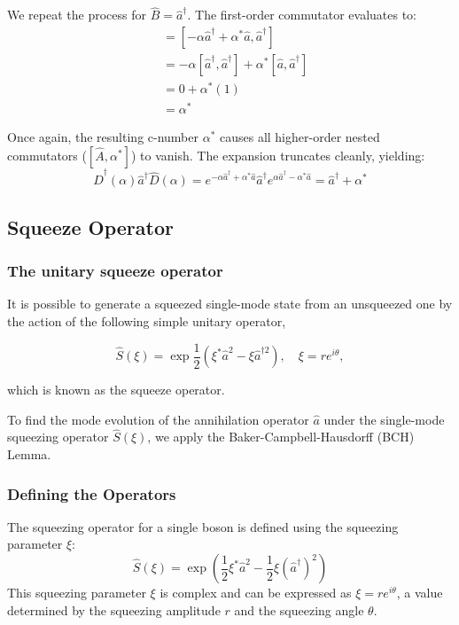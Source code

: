We repeat the process for $\hat{B} = \hat{a}^{\dagger}$. The first-order commutator evaluates to:
\begin{align*}
[\hat{A},\hat{a}^{\dagger}] &= [-\alpha\hat{a}^{\dagger}+\alpha^{*}\hat{a}, \hat{a}^{\dagger}] \\
&= -\alpha[\hat{a}^{\dagger},\hat{a}^{\dagger}] + \alpha^{*}[\hat{a},\hat{a}^{\dagger}] \\
&= 0 + \alpha^{*}(1) \\
&= \alpha^{*}
\end{align*}

Once again, the resulting c-number $\alpha^{*}$ causes all higher-order nested commutators ($[\hat{A},\alpha^{*}]$) to vanish. The expansion truncates cleanly, yielding:
\begin{equation*} \hat{D}^{\dagger}(\alpha)\hat{a}^{\dagger}\hat{D}(\alpha) = e^{-\alpha\hat{a}^{\dagger}+\alpha^{*}\hat{a}}\hat{a}^{\dagger}e^{\alpha\hat{a}^{\dagger}-\alpha^{*}\hat{a}} = \hat{a}^{\dagger} + \alpha^{*} \end{equation*}

\subsection{Squeeze Operator}

\subsubsection{The unitary squeeze operator}

It is possible to generate a squeezed single-mode state from an unsqueezed one by the action of the following simple unitary operator,

\begin{equation*}
\hat{S}(\xi)=\exp\frac{1}{2}(\xi^{*}\hat{a}^{ 2}-\xi\hat{a}^{\dagger 2}), \quad \xi=r e^{i\theta},
\end{equation*}

which is known as the squeeze operator.

To find the mode evolution of the annihilation operator $\hat{a}$ under the single-mode squeezing operator $\hat{S}(\xi)$, we apply the Baker-Campbell-Hausdorff (BCH) Lemma.

\subsubsection{Defining the Operators}
The squeezing operator for a single boson is defined using the squeezing parameter $\xi$:
\begin{equation}
\hat{S}(\xi) = \exp\left(\frac{1}{2}\xi^*\hat{a}^2 - \frac{1}{2}\xi(\hat{a}^\dagger)^2\right)
\end{equation}
This squeezing parameter $\xi$ is complex and can be expressed as $\xi = r e^{i\theta}$, a value determined by the squeezing amplitude $r$ and the squeezing angle $\theta$.

